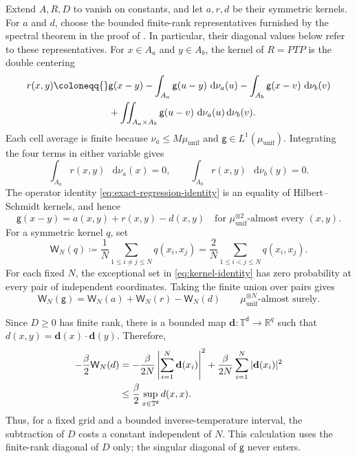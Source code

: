 \documentclass[11pt,reqno]{amsart}
\numberwithin{equation}{section}
\theoremstyle{plain}
\theoremstyle{definition}
\renewcommand{\d}{\mathsf d}
\newcommand{\dd}{\mathop{}\!\mathrm d}
\newcommand{\T}{\mathbb T}
\newcommand{\R}{\mathbb R}
\newcommand{\be}{\beta}
\newcommand{\g}{\mathsf g}
\newcommand{\muunif}{\mu_{\mathrm{unif}}}
\begin{document}
Extend $A,R,D$ to vanish on constants, and let $a,r,d$ be their symmetric kernels. For $a$ and $d$, choose the bounded finite-rank representatives furnished by the spectral theorem in the proof of . In particular, their diagonal values below refer to these representatives. For $x\in A_a$ and $y\in A_b$, the kernel of $R=PTP$ is the double centering
\begin{align}
 r(x,y)
 \coloneqq{}&\g(x-y)
 -\int_{A_a}\g(u-y)\,\dd\nu_a(u)
 -\int_{A_b}\g(x-v)\,\dd\nu_b(v)
 \notag\\
 &+\iint_{A_a\times A_b}\g(u-v)\,\dd\nu_a(u)\dd\nu_b(v).
 \label{eq:blockwise-centered-kernel}
\end{align}
Each cell average is finite because $\nu_a\leq M\muunif$ and $\g\in L^1(\muunif)$. Integrating the four terms in either variable gives
\begin{equation}
 \int_{A_a}r(x,y)\,\dd\nu_a(x)=0,
 \qquad
 \int_{A_b}r(x,y)\,\dd\nu_b(y)=0.
 \label{eq:blockwise-canonicality}
\end{equation}
The operator identity \eqref{eq:exact-regression-identity} is an equality of Hilbert--Schmidt kernels, and hence
\begin{equation}
 \g(x-y)=a(x,y)+r(x,y)-d(x,y)
 \quad\text{for }\muunif^{\otimes2}\text{-almost every }(x,y).
 \label{eq:kernel-identity}
\end{equation}
For a symmetric kernel $q$, set
\begin{equation}
 \mathsf W_N(q)
 \coloneqq\frac1N\sum_{1\leq i\neq j\leq N}q(x_i,x_j)
 =\frac2N\sum_{1\leq i<j\leq N}q(x_i,x_j).
 \label{eq:particle-kernel-sum}
\end{equation}
For each fixed $N$, the exceptional set in \eqref{eq:kernel-identity} has zero probability at every pair of independent coordinates. Taking the finite union over pairs gives
\begin{equation}
 \mathsf W_N(\g)=\mathsf W_N(a)+\mathsf W_N(r)-\mathsf W_N(d)
 \qquad \muunif^{\otimes N}\text{-almost surely}.
 \label{eq:particle-regression-identity}
\end{equation}

Since \(D\geq0\) has finite rank, there is a bounded map \(\mathbf d:\T^{\d}\to\R^q\) such that \(d(x,y)=\mathbf d(x)\cdot\mathbf d(y)\).  Therefore,
\begin{align}
 -\frac\be2\mathsf W_N(d)
 &=-\frac\be{2N}\left|\sum_{i=1}^N\mathbf d(x_i)\right|^2
 +\frac\be{2N}\sum_{i=1}^N|\mathbf d(x_i)|^2
 \notag\\
 &\leq\frac\be2\sup_{x\in\T^{\d}}d(x,x).
 \label{eq:diagonal-correction-bound}
\end{align}
Thus, for a fixed grid and a bounded inverse-temperature interval, the subtraction of $D$ costs a constant independent of $N$. This calculation uses the finite-rank diagonal of $D$ only; the singular diagonal of $\g$ never enters.
\end{document}
